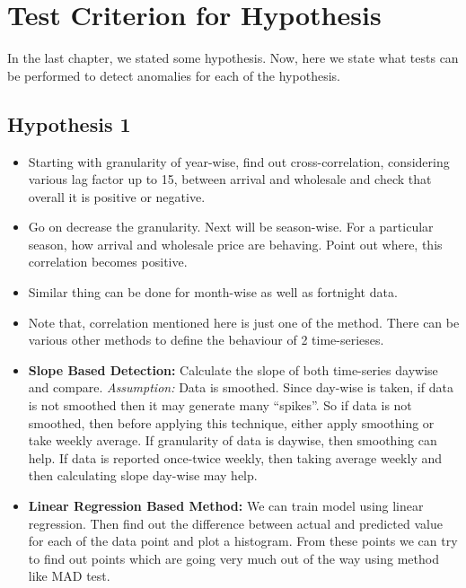 \section{Test Criterion for Hypothesis}

In the last chapter, we stated some hypothesis. Now, here we state what tests can be performed to detect anomalies for each of the hypothesis. 

\subsection{Hypothesis 1}

\begin{itemize}

\item Starting with granularity of year-wise, find out cross-correlation, considering various lag factor up to 15,  between arrival and wholesale and check that overall it is positive or negative.

\item Go on decrease the granularity. Next will be season-wise. For a particular season, how arrival and wholesale price are behaving. Point out where, this correlation becomes positive.

\item Similar thing can be done for month-wise as well as fortnight data. 

\item Note that, correlation mentioned here is just one of the method. There can be various other methods to define the behaviour of 2 time-serieses.

\item \textbf{Slope Based Detection:} Calculate the slope of both time-series daywise and compare. \textit{Assumption:} Data is smoothed. Since day-wise is taken, if data is not smoothed then it may generate many “spikes”. So if data is not smoothed, then before applying this technique, either apply smoothing or take weekly average. If granularity of data is daywise, then smoothing can help. If data is reported once-twice weekly, then taking average weekly and then calculating slope day-wise may help.

\item \textbf{Linear Regression Based Method:} We can train model using linear regression. Then find out the difference between actual and predicted value for each of the data point and plot a histogram. From these points we can try to find out points which are going very much out of the way using method like MAD test.

\end{itemize}

